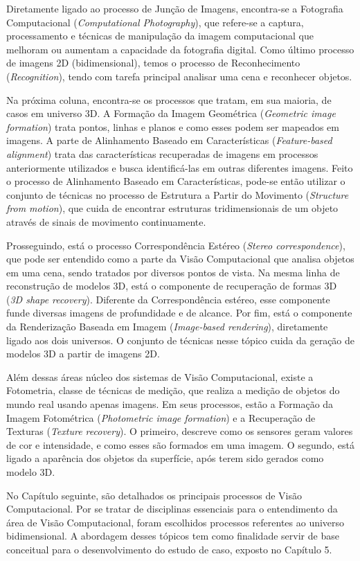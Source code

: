 Diretamente ligado ao processo de Junção de Imagens, encontra-se a Fotografia Computacional (\textit{Computational Photography}), que refere-se a captura, processamento e técnicas de manipulação da imagem computacional que melhoram ou aumentam a capacidade da fotografia digital. Como último processo de imagens 2D (bidimensional), temos o processo de Reconhecimento (\textit{Recognition}), tendo com tarefa principal analisar uma cena e reconhecer objetos.

Na próxima coluna, encontra-se os processos que tratam, em sua maioria, de casos em universo 3D. A Formação da Imagem Geométrica (\textit{Geometric image formation}) trata pontos, linhas e planos e como esses podem ser mapeados em imagens. A parte de Alinhamento Baseado em Características (\textit{Feature-based alignment}) trata das características recuperadas de imagens em processos anteriormente utilizados e busca identificá-las em outras diferentes imagens. Feito o processo de Alinhamento Baseado em Características, pode-se então utilizar o conjunto de técnicas no processo de Estrutura a Partir do Movimento (\textit{Structure from motion}), que cuida de encontrar estruturas tridimensionais de um objeto através de sinais de movimento continuamente.

Prosseguindo, está o processo Correspondência Estéreo (\textit{Stereo correspondence}), que pode ser entendido como a parte da Visão Computacional que analisa objetos em uma cena, sendo tratados por diversos pontos de vista. Na mesma linha de reconstrução de modelos 3D, está o componente de recuperação de formas 3D (\textit{3D shape recovery}). Diferente da Correspondência estéreo, esse componente funde diversas imagens de profundidade e de alcance. Por fim, está o componente da Renderização Baseada em Imagem (\textit{Image-based rendering}), diretamente ligado aos dois universos. O conjunto de técnicas nesse tópico cuida da geração de modelos 3D a partir de imagens 2D.

Além dessas áreas núcleo dos sistemas de Visão Computacional, existe a Fotometria, classe de técnicas de medição, que realiza a medição de objetos do mundo real usando apenas imagens. Em seus processos, estão a Formação da Imagem Fotométrica (\textit{Photometric image formation}) e a Recuperação de Texturas (\textit{Texture recovery}). O primeiro, descreve como os sensores geram valores de cor e intensidade, e como esses são formados em uma imagem. O segundo, está ligado a aparência dos objetos da superfície, após terem sido gerados como modelo 3D.

No Capítulo seguinte, são detalhados os principais processos de Visão Computacional. Por se tratar de disciplinas essenciais para o entendimento da área de Visão Computacional, foram escolhidos processos referentes ao universo bidimensional. A abordagem desses tópicos tem como finalidade servir de base conceitual para o desenvolvimento do estudo de caso, exposto no Capítulo 5.
